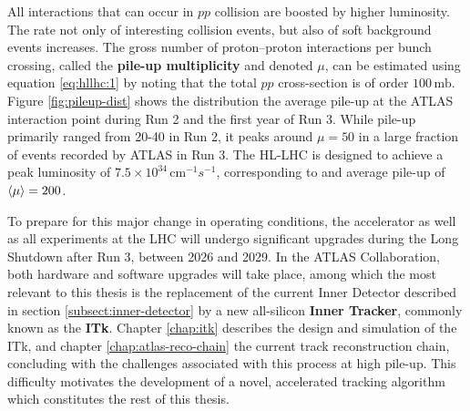 All interactions that can occur in $pp$ collision are boosted by higher luminosity. 
The rate not only of interesting collision events, but also of soft background events increases.
The gross number of proton--proton interactions per bunch crossing, called the \textbf{pile-up multiplicity} and denoted $\mu$, can be estimated using equation \eqref{eq:hllhc:1} by noting that the total $pp$ cross-section is of order $100\,\mathrm{mb}$.
Figure \ref{fig:pileup-dist} shows the distribution the average pile-up at the ATLAS interaction point during Run 2 and the first year of Run 3.
While pile-up primarily ranged from 20-40 in Run 2, it peaks around $\mu=50$ in a large fraction of events recorded by ATLAS in Run 3.
The HL-LHC is designed to achieve a peak luminosity of $7.5\times 10^{34} \, \mathrm{cm}^{-1}s^{-1} $, corresponding to and average pile-up of $\expval{\mu}=200$.

To prepare for this major change in operating conditions, the accelerator as well as all experiments at the LHC will undergo significant upgrades during the Long Shutdown after Run 3, between 2026 and 2029. 
In the ATLAS Collaboration, both hardware and software upgrades will take place, among which the most relevant to this thesis is the replacement of the current Inner Detector described in section \ref{subsect:inner-detector} by a new all-silicon \textbf{Inner Tracker}, commonly known as the \textbf{ITk}. 
Chapter \ref{chap:itk} describes the design and simulation of the ITk, and chapter \ref{chap:atlas-reco-chain} the current track reconstruction chain, concluding with the challenges associated with this process at high pile-up. 
This difficulty motivates the development of a novel, accelerated tracking algorithm which constitutes the rest of this thesis.





